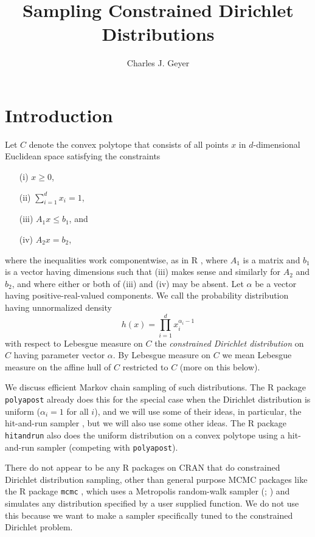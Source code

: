 \documentclass[11pt]{article}
\begin{document}
\title{Sampling Constrained Dirichlet Distributions}

\author{Charles J. Geyer}

\maketitle

\section{Introduction} \label{sec:intro}

Let $C$ denote the convex polytope that consists of all points $x$ in
$d$-dimensional Euclidean space satisfying the constraints
\begin{enumerate}
\item[(i)] $x \ge 0$,
\item[(ii)] $\sum_{i = 1}^d x_i = 1$,
\item[(iii)] $A_1 x \le b_1$, and
\item[(iv)] $A_2 x = b_2$,
\end{enumerate}
where the inequalities work componentwise, as in R \citep{r},
where $A_1$ is a matrix
and $b_1$ is a vector having dimensions such that (iii) makes sense and
similarly for $A_2$ and $b_2$, and where either or both of (iii) and (iv)
may be absent.  Let $\alpha$ be a vector having positive-real-valued
components.  We call the probability distribution having unnormalized density
\begin{equation} \label{eq:unnormalized-density}
   h(x) = \prod_{i = 1}^d x_i^{\alpha_i - 1}
\end{equation}
with respect to Lebesgue measure on $C$ the \emph{constrained Dirichlet
distribution} on $C$ having parameter vector $\alpha$.
By Lebesgue measure on $C$ we mean Lebesgue measure on the affine hull
of $C$ restricted to $C$ (more on this below).

We discuss efficient Markov chain sampling of such distributions.
The R package \texttt{polyapost} \citep{polyapost} already does this
for the special case when the Dirichlet distribution is uniform
($\alpha_i = 1$ for all $i$), and we will use some
of their ideas, in particular, the hit-and-run sampler
\citep*{smith,hit-run-one,hit-run-two}, but we will also use some other ideas.
The R package \texttt{hitandrun} \citep{hitandrun}
also does the uniform distribution on a
convex polytope using a hit-and-run sampler (competing with \texttt{polyapost}).

There do not appear to be any R packages on CRAN that do constrained Dirichlet
distribution sampling, other than general purpose MCMC packages like
the R package \texttt{mcmc} \citep{mcmc}, which uses a Metropolis
random-walk sampler (\citealp{metropolis-et-al};
\citealp[Section~2.3.2]{tierney})
and simulates any distribution specified by a user
supplied function.  We do not use this because we want to make a sampler
specifically tuned to the constrained Dirichlet problem.
\end{document}
